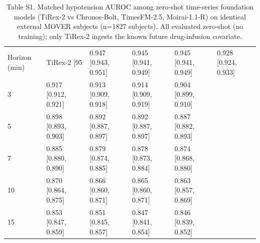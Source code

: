 \begin{table}[t]\centering\footnotesize
\caption{Table S1. Matched hypotension AUROC among zero-shot time-series foundation models (TiRex-2 vs Chronos-Bolt, TimesFM-2.5, Moirai-1.1-R) on identical external MOVER subjects (n=1827 subjects). All evaluated zero-shot (no training); only TiRex-2 ingests the known future drug-infusion covariate.}
\begin{tabular}{lllll}
\toprule
Horizon (min) & TiRex-2 [95%
 & 0.947 [0.943, 0.951] & 0.945 [0.941, 0.949] & 0.945 [0.941, 0.949] & 0.928 [0.924, 0.933] \\
3 & 0.917 [0.912, 0.921] & 0.913 [0.909, 0.918] & 0.914 [0.909, 0.919] & 0.904 [0.899, 0.910] \\
5 & 0.898 [0.893, 0.903] & 0.892 [0.887, 0.897] & 0.892 [0.887, 0.897] & 0.887 [0.882, 0.893] \\
7 & 0.885 [0.880, 0.890] & 0.879 [0.874, 0.885] & 0.878 [0.873, 0.884] & 0.874 [0.868, 0.880] \\
10 & 0.870 [0.864, 0.875] & 0.866 [0.860, 0.871] & 0.865 [0.860, 0.871] & 0.863 [0.857, 0.869] \\
15 & 0.853 [0.847, 0.859] & 0.851 [0.845, 0.857] & 0.847 [0.841, 0.854] & 0.846 [0.839, 0.852] \\
\bottomrule
\end{tabular}
\end{table}
